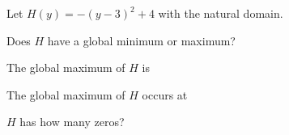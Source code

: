 \documentclass{ximera}
\author{Lee Wayand}
\begin{document}
Let $H(y) = -(y-3)^2 + 4$ with the natural domain. \\



\begin{exercise} Does $H$ have a global minimum or maximum?

\begin{multipleChoice}
\end{multipleChoice}

\end{exercise}








\begin{exercise} The global maximum of $H$ is

\begin{multipleChoice}
\end{multipleChoice}

\end{exercise}








\begin{exercise} The global maximum of $H$ occurs at

\begin{multipleChoice}
\end{multipleChoice}

\end{exercise}








\begin{exercise} $H$ has how many zeros?

\begin{multipleChoice}
\end{multipleChoice}

\end{exercise}
\end{document}
